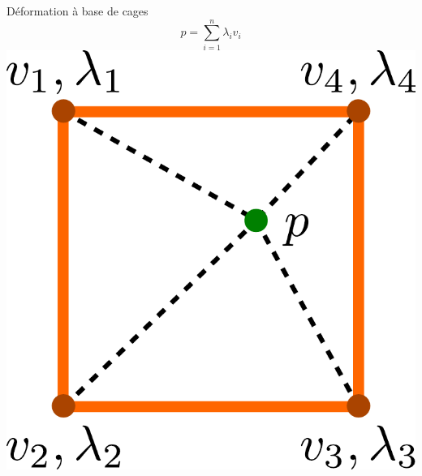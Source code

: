 \documentclass[xcolor=x11names,compress]{beamer}
\renewcommand{\(}{\begin{columns}} \renewcommand{\)}{\end{columns}}
\newcommand{\<}[1]{\begin{column}{#1}} \renewcommand{\>}{\end{column}}
\begin{document}
\begin{frame}{Déformation à base de cages}
  \begin{displaymath}
    p = \sum_{i=1}^n \lambda_i v_i
  \end{displaymath}
  \centering
  \includegraphics[scale=0.3]{Deformation-Cages}
\end{frame}
\end{document}
